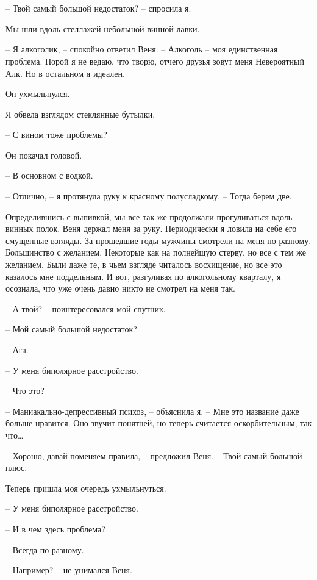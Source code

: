 \documentclass[
]{book}
\begin{document}
\hypertarget{chapter-9}{%
\chapter{~}\label{chapter-9}}

-- Твой самый большой недостаток? -- спросила я.

Мы шли вдоль стеллажей небольшой винной лавки.

-- Я алкоголик, -- спокойно ответил Веня. -- Алкоголь -- моя единственная проблема. Порой я не ведаю, что творю, отчего друзья зовут меня Невероятный Алк. Но в остальном я идеален.

Он ухмыльнулся.

Я обвела взглядом стеклянные бутылки.

-- С вином тоже проблемы?

Он покачал головой.

-- В основном с водкой.

-- Отлично, -- я протянула руку к красному полусладкому. -- Тогда берем две.

Определившись с выпивкой, мы все так же продолжали прогуливаться вдоль винных полок. Веня держал меня за руку. Периодически я ловила на себе его смущенные взгляды. За прошедшие годы мужчины смотрели на меня по-разному. Большинство с желанием. Некоторые как на полнейшую стерву, но все с тем же желанием. Были даже те, в чьем взгляде читалось восхищение, но все это казалось мне поддельным. И вот, разгуливая по алкогольному кварталу, я осознала, что уже очень давно никто не смотрел на меня так.

-- А твой? -- поинтересовался мой спутник.

-- Мой самый большой недостаток?

-- Ага.

-- У меня биполярное расстройство.

-- Что это?

-- Маниакально-депрессивный психоз, -- объяснила я. -- Мне это название даже больше нравится. Оно звучит понятней, но теперь считается оскорбительным, так что\ldots{}

-- Хорошо, давай поменяем правила, -- предложил Веня. -- Твой самый большой плюс.

Теперь пришла моя очередь ухмыльнуться.

-- У меня биполярное расстройство.

-- И в чем здесь проблема?

-- Всегда по-разному.

-- Например? -- не унимался Веня.
\end{document}
